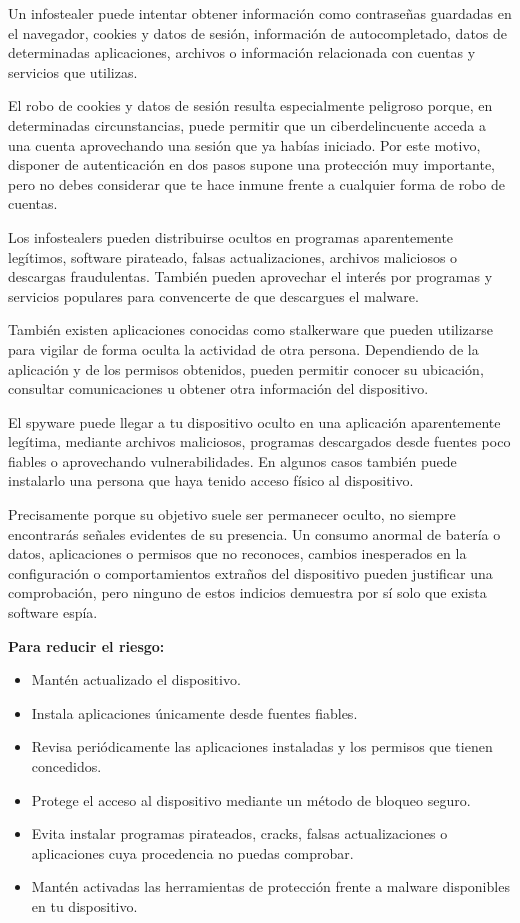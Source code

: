 \documentclass[
  spanish,
  a4paper,
  openany]{book}
\begin{document}
Un infostealer puede intentar obtener información como contraseñas guardadas en el navegador, cookies y datos de sesión, información de autocompletado, datos de determinadas aplicaciones, archivos o información relacionada con cuentas y servicios que utilizas.

El robo de cookies y datos de sesión resulta especialmente peligroso porque, en determinadas circunstancias, puede permitir que un ciberdelincuente acceda a una cuenta aprovechando una sesión que ya habías iniciado. Por este motivo, disponer de autenticación en dos pasos supone una protección muy importante, pero no debes considerar que te hace inmune frente a cualquier forma de robo de cuentas.

Los infostealers pueden distribuirse ocultos en programas aparentemente legítimos, software pirateado, falsas actualizaciones, archivos maliciosos o descargas fraudulentas. También pueden aprovechar el interés por programas y servicios populares para convencerte de que descargues el malware.

También existen aplicaciones conocidas como stalkerware que pueden utilizarse para vigilar de forma oculta la actividad de otra persona. Dependiendo de la aplicación y de los permisos obtenidos, pueden permitir conocer su ubicación, consultar comunicaciones u obtener otra información del dispositivo.

El spyware puede llegar a tu dispositivo oculto en una aplicación aparentemente legítima, mediante archivos maliciosos, programas descargados desde fuentes poco fiables o aprovechando vulnerabilidades. En algunos casos también puede instalarlo una persona que haya tenido acceso físico al dispositivo.

Precisamente porque su objetivo suele ser permanecer oculto, no siempre encontrarás señales evidentes de su presencia. Un consumo anormal de batería o datos, aplicaciones o permisos que no reconoces, cambios inesperados en la configuración o comportamientos extraños del dispositivo pueden justificar una comprobación, pero ninguno de estos indicios demuestra por sí solo que exista software espía.

\textbf{Para reducir el riesgo:}

\begin{itemize}
\item
  Mantén actualizado el dispositivo.
\item
  Instala aplicaciones únicamente desde fuentes fiables.
\item
  Revisa periódicamente las aplicaciones instaladas y los permisos que tienen concedidos.
\item
  Protege el acceso al dispositivo mediante un método de bloqueo seguro.
\item
  Evita instalar programas pirateados, cracks, falsas actualizaciones o aplicaciones cuya procedencia no puedas comprobar.
\item
  Mantén activadas las herramientas de protección frente a malware disponibles en tu dispositivo.
\end{itemize}
\end{document}
